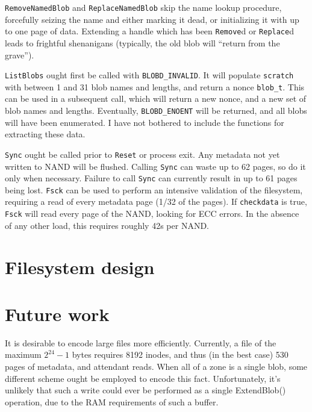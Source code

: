 \documentclass[letterpaper,10pt]{article}
\begin{document}
\texttt{RemoveNamedBlob} and \texttt{ReplaceNamedBlob} skip the name lookup
procedure, forcefully seizing the name and either marking it dead, or
initializing it with up to one page of data. Extending a handle which has been
\texttt{Remove}d or \texttt{Replace}d leads to frightful shenanigans (typically,
the old blob will ``return from the grave'').

\texttt{ListBlobs} ought first be called with \texttt{BLOBD\_INVALID}. It will
populate \texttt{scratch} with between 1 and 31 blob names and lengths, and
return a nonce \texttt{blob\_t}. This can be used in a subsequent call, which
will return a new nonce, and a new set of blob names and lengths. Eventually,
\texttt{BLOBD\_ENOENT} will be returned, and all blobs will have been
enumerated. I have not bothered to include the functions for extracting these
data.

\texttt{Sync} ought be called prior to \texttt{Reset} or process exit. Any
metadata not yet written to NAND will be flushed. Calling \texttt{Sync} can
waste up to 62 pages, so do it only when necessary. Failure to call \texttt{Sync}
can currently result in up to 61 pages being lost. \texttt{Fsck} can be used to
perform an intensive validation of the filesystem, requiring a read of every
metadata page (1/32 of the pages). If \texttt{checkdata} is true, \texttt{Fsck}
will read every page of the NAND, looking for ECC errors. In the absence of
any other load, this requires roughly 42s per NAND.

\section{Filesystem design}

\section{Future work}
It is desirable to encode large files more efficiently. Currently, a file of
the maximum $2^{24}-1$ bytes requires 8192 inodes, and thus (in the best case)
530 pages of metadata, and attendant reads. When all of a zone is a single
blob, some different scheme ought be employed to encode this fact.
Unfortunately, it's unlikely that such a write could ever be performed as a
single ExtendBlob() operation, due to the RAM requirements of such a buffer.
\end{document}
